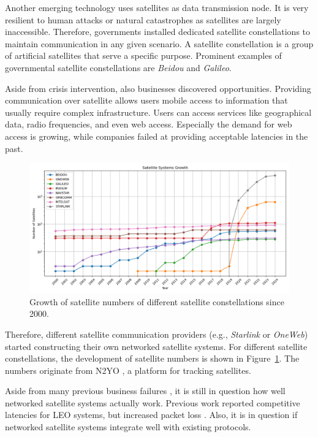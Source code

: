 Another emerging technology uses satellites as data transmission node. It is very resilient to human attacks or natural catastrophes as satellites are largely inaccessible. Therefore, governments installed dedicated satellite constellations to maintain communication in any given scenario. A satellite constellation is a group of artificial satellites that serve a specific purpose. Prominent examples of governmental satellite constellations are \textit{Beidou} and \textit{Galileo}.

Aside from crisis intervention, also businesses discovered opportunities. Providing communication over satellite allows users mobile access to information that usually require complex infrastructure. Users can access services like geographical data, radio frequencies, and even web access. Especially the demand for web access is growing, while companies failed at providing acceptable latencies in the past.

\begin{figure}
	\label{fig:satellitegrowth}
	\centering
	\includegraphics[width=\textwidth]{./chapters/img/satellite-growth.png}
	\caption{Growth of satellite numbers of different satellite constellations since 2000.}
\end{figure}

Therefore, different satellite communication providers (e.g., \textit{Starlink} or \textit{OneWeb}) started constructing their own networked satellite systems.
For different satellite constellations, the development of satellite numbers is shown in Figure~\ref{fig:satellitegrowth}. The numbers originate from N2YO \cite{N2YO2024}, a platform for tracking satellites.

Aside from many previous business failures \cite{Chan2002, Barboza2000}, it is still in question how well networked satellite systems actually work. Previous work reported competitive latencies for \ac{LEO} systems, but increased packet loss \cite{DBLP:conf/imc/MichelTGB22}.
Also, it is in question if networked satellite systems integrate well with existing protocols.


